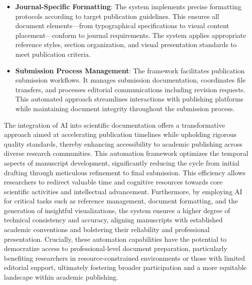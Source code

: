 \begin{itemize}

    \item \textbf{Journal-Specific Formatting}: The system implements precise formatting protocols according to target publication guidelines. This ensures all document elements—from typographical specifications to visual content placement—conform to journal requirements. The system applies appropriate reference styles, section organization, and visual presentation standards to meet publication criteria.

    \item \textbf{Submission Process Management}: The framework facilitates publication submission workflows. It manages submission documentation, coordinates file transfers, and processes editorial communications including revision requests. This automated approach streamlines interactions with publishing platforms while maintaining document integrity throughout the submission process.
    
\end{itemize}




The integration of AI into scientific documentation offers a transformative approach aimed at accelerating publication timelines while upholding rigorous quality standards, thereby enhancing accessibility to academic publishing across diverse research communities. This automation framework optimizes the temporal aspects of manuscript development, significantly reducing the cycle from initial drafting through meticulous refinement to final submission. This efficiency allows researchers to redirect valuable time and cognitive resources towards core scientific activities and intellectual advancement. Furthermore, by employing AI for critical tasks such as reference management, document formatting, and the generation of insightful visualizations, the system ensures a higher degree of technical consistency and accuracy, aligning manuscripts with established academic conventions and bolstering their reliability and professional presentation. Crucially, these automation capabilities have the potential to democratize access to professional-level document preparation, particularly benefiting researchers in resource-constrained environments or those with limited editorial support, ultimately fostering broader participation and a more equitable landscape within academic publishing.

